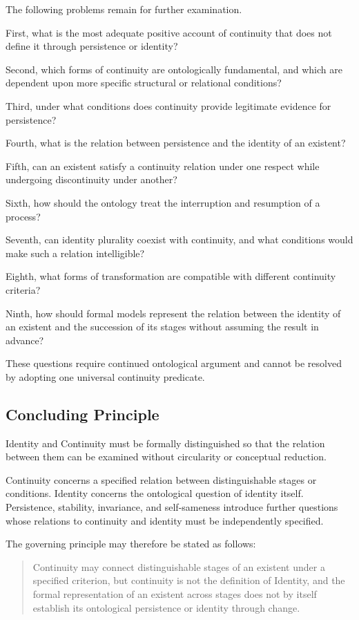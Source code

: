 The following problems
remain for further
examination.

First, what is the
most adequate positive
account of continuity
that does not define
it through persistence
or identity?

Second, which forms
of continuity are
ontologically fundamental,
and which are dependent
upon more specific
structural or relational
conditions?

Third, under what
conditions does continuity
provide legitimate
evidence for persistence?

Fourth, what is the
relation between
persistence and the
identity of an existent?

Fifth, can an existent
satisfy a continuity
relation under one
respect while undergoing
discontinuity under
another?

Sixth, how should
the ontology treat
the interruption
and resumption of
a process?

Seventh, can identity
plurality coexist
with continuity,
and what conditions
would make such
a relation intelligible?

Eighth, what forms
of transformation
are compatible with
different continuity
criteria?

Ninth, how should
formal models represent
the relation between
the identity of an
existent and the
succession of its
stages without assuming
the result in advance?

These questions
require continued
ontological argument
and cannot be resolved
by adopting one
universal continuity
predicate.

\subsection{Concluding Principle}

Identity and Continuity
must be formally
distinguished so that
the relation between
them can be examined
without circularity
or conceptual reduction.

Continuity concerns
a specified relation
between distinguishable
stages or conditions.
Identity concerns
the ontological question
of identity itself.
Persistence, stability,
invariance, and
self-sameness introduce
further questions
whose relations to
continuity and identity
must be independently
specified.

The governing principle
may therefore be stated
as follows:

\begin{quote}
Continuity may connect
distinguishable stages
of an existent under
a specified criterion,
but continuity is
not the definition
of Identity, and
the formal representation
of an existent across
stages does not by
itself establish
its ontological
persistence or
identity through
change.
\end{quote}

